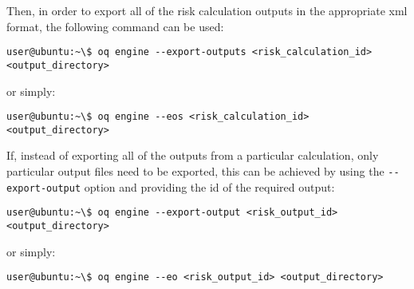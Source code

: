 Then, in order to export all of the risk calculation outputs in the
appropriate xml format, the following command can be used:

\begin{verbatim}
user@ubuntu:~\$ oq engine --export-outputs <risk_calculation_id> <output_directory>
\end{verbatim}

or simply:

\begin{verbatim}
user@ubuntu:~\$ oq engine --eos <risk_calculation_id> <output_directory>
\end{verbatim}

If, instead of exporting all of the outputs from a particular calculation,
only particular output files need to be exported, this can be achieved by
using the \Verb+--export-output+ option and providing the id of the required
output:

\begin{verbatim}
user@ubuntu:~\$ oq engine --export-output <risk_output_id> <output_directory>
\end{verbatim}

or simply:

\begin{verbatim}
user@ubuntu:~\$ oq engine --eo <risk_output_id> <output_directory>
\end{verbatim}